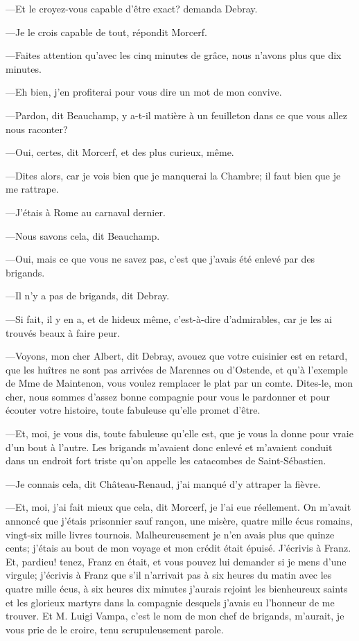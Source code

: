 —Et le croyez-vous capable d'être exact? demanda Debray. 

—Je le crois capable de tout, répondit Morcerf. 

—Faites attention qu'avec les cinq minutes de grâce, nous n'avons plus que dix minutes. 

—Eh bien, j'en profiterai pour vous dire un mot de mon convive. 

—Pardon, dit Beauchamp, y a-t-il matière à un feuilleton dans ce que vous allez nous raconter? 

—Oui, certes, dit Morcerf, et des plus curieux, même. 

—Dites alors, car je vois bien que je manquerai la Chambre; il faut bien que je me rattrape. 

—J'étais à Rome au carnaval dernier. 

—Nous savons cela, dit Beauchamp. 

—Oui, mais ce que vous ne savez pas, c'est que j'avais été enlevé par des brigands. 

—Il n'y a pas de brigands, dit Debray. 

—Si fait, il y en a, et de hideux même, c'est-à-dire d'admirables, car je les ai trouvés beaux à faire peur. 

—Voyons, mon cher Albert, dit Debray, avouez que votre cuisinier est en retard, que les huîtres ne sont pas arrivées de Marennes ou d'Ostende, et qu'à l'exemple de Mme de Maintenon, vous voulez remplacer le plat par un comte. Dites-le, mon cher, nous sommes d'assez bonne compagnie pour vous le pardonner et pour écouter votre histoire, toute fabuleuse qu'elle promet d'être. 

—Et, moi, je vous dis, toute fabuleuse qu'elle est, que je vous la donne pour vraie d'un bout à l'autre. Les brigands m'avaient donc enlevé et m'avaient conduit dans un endroit fort triste qu'on appelle les catacombes de Saint-Sébastien. 

—Je connais cela, dit Château-Renaud, j'ai manqué d'y attraper la fièvre. 

—Et, moi, j'ai fait mieux que cela, dit Morcerf, je l'ai eue réellement. On m'avait annoncé que j'étais prisonnier sauf rançon, une misère, quatre mille écus romains, vingt-six mille livres tournois. Malheureusement je n'en avais plus que quinze cents; j'étais au bout de mon voyage et mon crédit était épuisé. J'écrivis à Franz. Et, pardieu! tenez, Franz en était, et vous pouvez lui demander si je mens d'une virgule; j'écrivis à Franz que s'il n'arrivait pas à six heures du matin avec les quatre mille écus, à six heures dix minutes j'aurais rejoint les bienheureux saints et les glorieux martyrs dans la compagnie desquels j'avais eu l'honneur de me trouver. Et M. Luigi Vampa, c'est le nom de mon chef de brigands, m'aurait, je vous prie de le croire, tenu scrupuleusement parole. 

